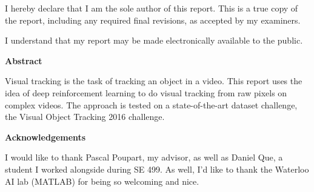   \noindent
I hereby declare that I am the sole author of this report. This is a true copy of the report, including any required final revisions, as accepted by my examiners.

  \bigskip
  
  \noindent
I understand that my report may be made electronically available to the public.

\cleardoublepage


\begin{center}\textbf{Abstract}\end{center}

Visual tracking is the task of tracking an object in a video. This report uses the idea of deep reinforcement learning to do visual tracking from raw pixels on complex videos. The approach is tested on a state-of-the-art dataset challenge, the Visual Object Tracking 2016 challenge.


\cleardoublepage


\begin{center}\textbf{Acknowledgements}\end{center}

I would like to thank Pascal Poupart, my advisor, as well as Daniel Que, a student I worked alongside during SE 499. As well, I'd like to thank the Waterloo AI lab (MATLAB) for being so welcoming and nice.
\cleardoublepage


\renewcommand\contentsname{Table of Contents}
\tableofcontents
\cleardoublepage
{}


\listoffigures
\cleardoublepage
{}		%

\listofalgorithms
\cleardoublepage
{}		%



